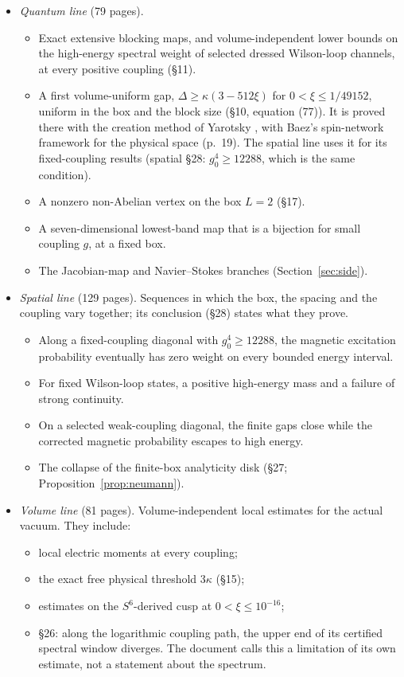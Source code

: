 \begin{itemize}
\item \emph{Quantum line} (79 pages).
\begin{itemize}
\item Exact extensive blocking maps, and volume-independent lower bounds on the high-energy spectral weight of selected dressed Wilson-loop channels, at every positive coupling (§11).
\item A first volume-uniform gap, $\Delta\ge\kappa(3-512\xi)$ for $0<\xi\le1/49152$, uniform in the box and the block size (§10, equation (77)). It is proved there with the creation method of Yarotsky \cite{Yarotsky}, with Baez's spin-network framework \cite{Baez} for the physical space (p.~19). The spatial line uses it for its fixed-coupling results (spatial §28: $g_0^4\ge12288$, which is the same condition).
\item A nonzero non-Abelian vertex on the box $L=2$ (§17).
\item A seven-dimensional lowest-band map that is a bijection for small coupling $g$, at a fixed box.
\item The Jacobian-map and Navier--Stokes branches (Section~\ref{sec:side}).
\end{itemize}
\item \emph{Spatial line} (129 pages). Sequences in which the box, the spacing and the coupling vary together; its conclusion (§28) states what they prove.
\begin{itemize}
\item Along a fixed-coupling diagonal with $g_0^4\ge12288$, the magnetic excitation probability eventually has zero weight on every bounded energy interval.
\item For fixed Wilson-loop states, a positive high-energy mass and a failure of strong continuity.
\item On a selected weak-coupling diagonal, the finite gaps close while the corrected magnetic probability escapes to high energy.
\item The collapse of the finite-box analyticity disk (§27; Proposition~\ref{prop:neumann}).
\end{itemize}
\item \emph{Volume line} (81 pages). Volume-independent local estimates for the actual vacuum. They include:
\begin{itemize}
\item local electric moments at every coupling;
\item the exact free physical threshold $3\kappa$ (§15);
\item estimates on the $S^6$-derived cusp at $0<\xi\le10^{-16}$;
\item §26: along the logarithmic coupling path, the upper end of its certified spectral window diverges. The document calls this a limitation of its own estimate, not a statement about the spectrum.
\end{itemize}
\end{itemize}

